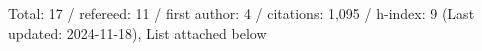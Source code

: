Total: 17 / refereed: 11 / first author: 4 / citations: 1,095 / h-index: 9 (Last updated: 2024-11-18), List attached below